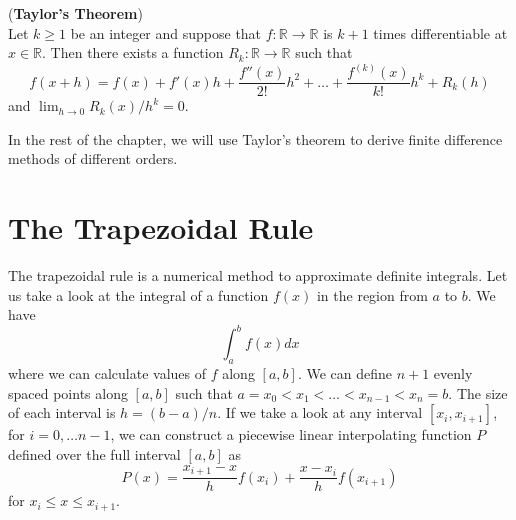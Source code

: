 \documentclass[00main.tex]{subfiles}
\begin{document}
\begin{theorem} (\textbf{Taylor's Theorem})\\
Let $k\geq 1$ be an integer and suppose that $f: \mathbb{R} \to \mathbb{R}$ is $k+1$ times differentiable at $x \in \mathbb{R}$. Then there exists a function $R_k: \mathbb{R} \to \mathbb{R}$ such that \begin{equation}
f(x+h) = f(x) + f'(x)h + \frac{f''(x)}{2!} h^2 + \hdots + \frac{f^{(k)}(x)}{k!} h^k + R_k(h) \label{taylor}
\end{equation} and $\lim_{h\to 0} R_k(x)/h^k = 0$.
\end{theorem}


In the rest of the chapter, we will use Taylor's theorem to derive finite difference methods of different orders.


\section{The Trapezoidal Rule}


The trapezoidal rule is a numerical method to approximate definite integrals. Let us take a look at the integral of a function $f(x)$ in the region from $a$ to $b$. We have \[  \int_a^b f(x) dx\] where we can calculate values of $f$ along $[a,b]$. We can define $n+1$ evenly spaced points along $\left[a,b\right]$ such that $ a=x_0 < x_1 < \hdots < x_{n-1} < x_n = b$. The size of each interval is $h = (b-a)/n$. If we take a look at any interval $\left[ x_i, x_{i+1} \right]$, for $i = 0, \hdots n-1$, we can construct a piecewise linear interpolating function $P$ defined over the full interval $\left[ a,b \right]$ as \[ P(x) = \frac{x_{i+1}-x}{h} f(x_i) + \frac{x-x_i}{h} f(x_{i+1})\] for $x_i \leq x \leq x_{i+1}$. 
\end{document}
